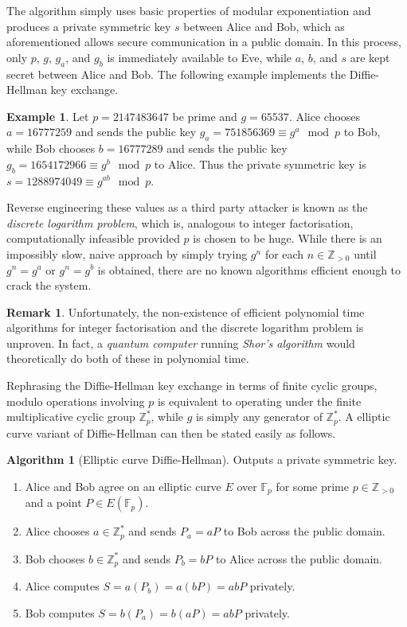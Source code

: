 \documentclass{article}
\newcommand{\F}{\mathbb{F}}
\newcommand{\Z}{\mathbb{Z}}
\newcommand{\rb}[1]{\left( #1 \right)}
\theoremstyle{definition}\newtheorem*{definition}{Definition}
\theoremstyle{definition}\newtheorem*{example}{Example}
\theoremstyle{definition}\newtheorem*{remark}{Remark}
\newtheorem{algorithm}[proposition]{Algorithm}
\begin{document}
The algorithm simply uses basic properties of modular exponentiation and produces a private symmetric key $ s $ between Alice and Bob, which as aforementioned allows secure communication in a public domain. In this process, only $ p $, $ g $, $ g_a $, and $ g_b $ is immediately available to Eve, while $ a $, $ b $, and $ s $ are kept secret between Alice and Bob. The following example implements the Diffie-Hellman key exchange.

\begin{example}
Let $ p = 2147483647 $ be prime and $ g = 65537 $. Alice chooses $ a = 16777259 $ and sends the public key $ g_a = 751856369 \equiv g^a \mod p $ to Bob, while Bob chooses $ b = 16777289 $ and sends the public key $ g_b = 1654172966 \equiv g^b \mod p $ to Alice. Thus the private symmetric key is $ s = 1288974049 \equiv g^{ab} \mod p $.
\end{example}

Reverse engineering these values as a third party attacker is known as the \emph{discrete logarithm problem}, which is, analogous to integer factorisation, computationally infeasible provided $ p $ is chosen to be huge. While there is an impossibly slow, naive approach by simply trying $ g^n $ for each $ n \in \Z_{> 0} $ until $ g^n = g^a $ or $ g^n = g^b $ is obtained, there are no known algorithms efficient enough to crack the system.

\begin{remark}
Unfortunately, the non-existence of efficient polynomial time algorithms for integer factorisation and the discrete logarithm problem is unproven. In fact, a \emph{quantum computer} running \emph{Shor's algorithm} would theoretically do both of these in polynomial time.
\end{remark}

Rephrasing the Diffie-Hellman key exchange in terms of finite cyclic groups, modulo operations involving $ p $ is equivalent to operating under the finite multiplicative cyclic group $ \Z_p^* $, while $ g $ is simply any generator of $ \Z_p^* $. A elliptic curve variant of Diffie-Hellman can then be stated easily as follows.

\begin{algorithm}[Elliptic curve Diffie-Hellman]
Outputs a private symmetric key.
\begin{enumerate}
\item Alice and Bob agree on an elliptic curve $ E $ over $ \F_p $ for some prime $ p \in \Z_{> 0} $ and a point $ P \in E\rb{\F_p} $.
\item Alice chooses $ a \in \Z_p^* $ and sends $ P_a = aP $ to Bob across the public domain.
\item Bob chooses $ b \in \Z_p^* $ and sends $ P_b = bP $ to Alice across the public domain.
\item Alice computes $ S = a\rb{P_b} = a\rb{bP} = abP $ privately.
\item Bob computes $ S = b\rb{P_a} = b\rb{aP} = abP $ privately.
\end{enumerate}
\end{algorithm}
\end{document}
